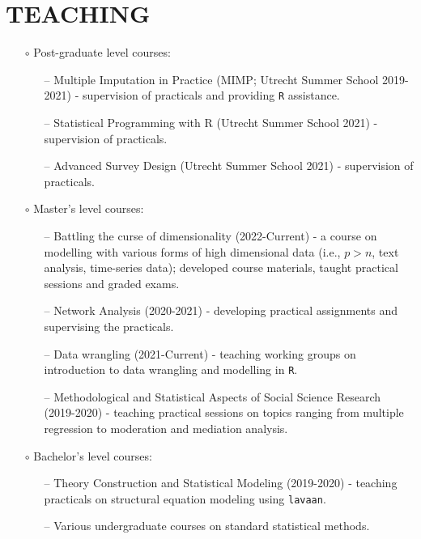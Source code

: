 \documentclass[11pt,a4paper,roman,colorlinks,linkcolor = blue]{moderncv}        %
\begin{document}
\section{TEACHING}

\begin{itemize}
\item[$\circ$] Post-graduate level courses:
{\begin{itemize}
  \item[--] Multiple Imputation in Practice (MIMP; Utrecht Summer School 2019-2021) - supervision of practicals and providing \texttt{R} assistance.
  \item[--] Statistical Programming with R (Utrecht Summer School 2021) - supervision of practicals.
  \item[--] Advanced Survey Design (Utrecht Summer School 2021) - supervision of practicals.
   \end{itemize}
  }
  \item[$\circ$] Master's level courses:
  {\begin{itemize}
    \item[--] Battling the curse of dimensionality (2022-Current) - a course on modelling with various forms of high dimensional data (i.e., $p > n$, text analysis, time-series data); developed course materials, taught practical sessions and graded exams.
    \item[--] Network Analysis (2020-2021) - developing practical assignments and supervising the practicals.
    \item[--] Data wrangling (2021-Current) - teaching working groups on introduction to data wrangling and modelling in \texttt{R}. 
    \item[--] Methodological and Statistical Aspects of Social Science Research (2019-2020) - teaching practical sessions on topics ranging from multiple regression to moderation and mediation analysis.
   \end{itemize}
  }
  \item[$\circ$] Bachelor's level courses:
  {\begin{itemize}
    \item[--] Theory Construction and Statistical Modeling (2019-2020) - teaching practicals on structural equation modeling using \texttt{lavaan}.
    \item[--] Various undergraduate courses on standard statistical methods.
   \end{itemize}
  }
\end{itemize}
\end{document}
